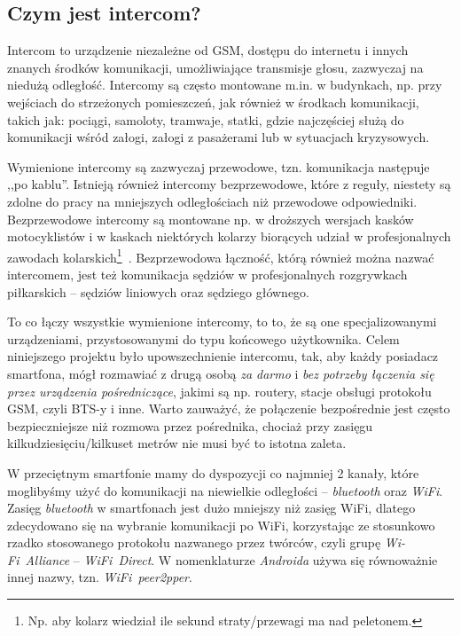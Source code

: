 \documentclass[a4paper,titlepage]{article}
\theoremstyle{break}
\begin{document}
\subsection{Czym jest intercom?}

Intercom to urządzenie niezależne od GSM, dostępu do internetu i innych znanych środków komunikacji, umożliwiające transmisje głosu, zazwyczaj na niedużą odległość. Intercomy są często montowane m.in. w budynkach, np. przy wejściach do strzeżonych pomieszczeń, jak również w środkach komunikacji, takich jak: pociągi, samoloty, tramwaje, statki, gdzie najczęściej służą do komunikacji wśród załogi, załogi z pasażerami lub w sytuacjach kryzysowych.

Wymienione intercomy są zazwyczaj przewodowe, tzn. komunikacja następuje ,,po kablu''. Istnieją również intercomy bezprzewodowe, które z reguły, niestety są zdolne do pracy na mniejszych odległościach niż przewodowe odpowiedniki. Bezprzewodowe intercomy są montowane np. w droższych wersjach kasków motocyklistów i w kaskach niektórych kolarzy biorących udział w profesjonalnych zawodach kolarskich\footnote{Np. aby kolarz wiedział ile sekund straty/przewagi ma nad peletonem.}~\cite{www:bike-intercom,www:bike-intercom-mce}. Bezprzewodowa łączność, którą również można nazwać intercomem, jest też komunikacja sędziów w profesjonalnych rozgrywkach piłkarskich -- sędziów liniowych oraz sędziego głównego.

To co łączy wszystkie wymienione intercomy, to to, że są one specjalizowanymi urządzeniami, przystosowanymi do typu końcowego użytkownika. Celem niniejszego projektu było upowszechnienie intercomu, tak, aby każdy posiadacz smartfona, mógł rozmawiać z drugą osobą \emph{za darmo} i \emph{bez potrzeby łączenia się przez urządzenia pośredniczące}, jakimi są np. routery, stacje obsługi protokołu GSM, czyli BTS-y i inne. Warto zauważyć, że połączenie bezpośrednie jest często bezpieczniejsze niż rozmowa przez pośrednika, chociaż przy zasięgu kilkudziesięciu/kilkuset metrów nie musi być to istotna zaleta.

W przeciętnym smartfonie mamy do dyspozycji co najmniej 2 kanały, które moglibyśmy użyć do komunikacji na niewielkie odległości -- \emph{bluetooth} oraz \emph{WiFi}. Zasięg \emph{bluetooth} w smartfonach jest dużo mniejszy niż zasięg WiFi, dlatego zdecydowano się na wybranie komunikacji po WiFi, korzystając ze stosunkowo rzadko stosowanego protokołu nazwanego przez twórców, czyli grupę \emph{Wi-Fi~Alliance} -- \emph{WiFi~Direct}. W nomenklaturze \emph{Androida} używa się równoważnie innej nazwy, tzn. \emph{WiFi~peer2pper}.
\end{document}
